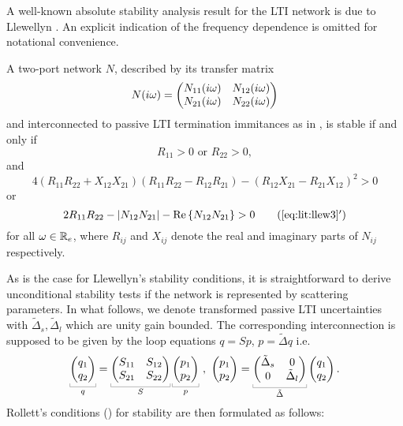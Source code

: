 A well-known absolute stability analysis result for the LTI network is due to Llewellyn \cite{llewellyn}. 
An explicit indication of the frequency dependence is omitted for notational convenience.
\begin{thm}\label{thm:apdx:llw}
A two-port network $N$,  described by its transfer matrix
\[
N(i\omega) = \begin{pmatrix}N_{11}(i\omega) &N_{12}(i\omega)\\N_{21}(i\omega) &N_{22}(i\omega)\end{pmatrix}
\]
and interconnected to passive LTI termination immitances as in , is stable if and only if
\begin{equation}R_{11} > 0\text{ or } R_{22} > 0,\label{eq:lit:llew2}\end{equation} and
\begin{equation}4\left(R_{11}R_{22}+X_{12}X_{21}\right)\left(R_{11}R_{22}-R_{12}R_{21}\right)-\left(R_{12}X_{21}-R_{21}X_{12}\right)^2 > 0\label{eq:lit:llew3}\end{equation} 
or
\begin{equation}2R_{11}R_{22}-\abs{N_{12}N_{21}}-\Re{N_{12}N_{21}} > 0\tag{\ref{eq:lit:llew3}$'$}\end{equation}%
for all $\omega\in\mathbb{R}_e$, where $R_{ij}$ and $X_{ij}$ denote the real and imaginary parts of $N_{ij}$ respectively.
\end{thm}

As is the case for Llewellyn's stability conditions, it is straightforward to derive 
unconditional stability {tests if} the network is represented by scattering parameters. 
In what follows, we denote transformed passive LTI uncertainties with $\tilde{\Delta}_{s}, 
\tilde{\Delta}_l$ which are unity gain bounded. The corresponding interconnection is 
supposed to be given by the loop equations
$q = S p$, $p=\tilde{\Delta} q$ i.e.
\begin{equation}
\underbracket[0.2pt]{\pmatr{q_1\\q_2}}_{q}=
\underbracket[0.2pt]{\pmatr{S_{11} &S_{12}\\S_{21} &S_{22}}}_{S}
\underbracket[0.2pt]{\pmatr{p_1\\p_2}}_{p} \ , \ \pmatr{p_1\\p_2}=
\underbracket[0.2pt]{\pmatr{\tilde{\Delta}_s&0\\0&\tilde{\Delta}_l}}_{\tilde{\Delta}} \pmatr{q_1\\q_2}.
\label{eq:rolic}
\end{equation}
Rollett's conditions (\cite{stern,rollett,kurokawa}) for stability are then formulated as follows: 

